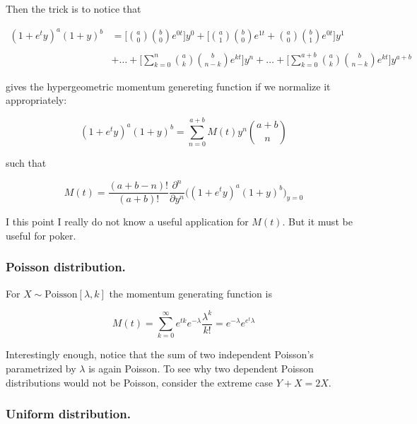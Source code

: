\documentclass[12pt]{article}
\begin{document}
\noindent
Then the trick is to notice that

\begin{align}
( 1 + e^{t} y )^{a} ( 1 + y )^{b} &= 
\bigg[ {a \choose 0} {b \choose 0}  e^{0 t} \bigg] y^{0} +
\bigg[ {a \choose 1} {b \choose 0}  e^{1 t} + {a \choose 0} {b \choose 1}  e^{0 t}  \bigg] y^{1} 
\nonumber \\
\nonumber \\
&+  \ldots + \bigg[ \sum_{k = 0}^{n} {a \choose k} {b \choose n - k}  e^{k t} \bigg] y^{n}  + \ldots 
+ \bigg[ \sum_{k = 0}^{a + b} {a \choose k} {b \choose n - k}  e^{k t} \bigg] y^{a+b} 
\end{align}

\noindent
gives the hypergeometric momentum genereting function if we normalize it appropriately:

\begin{equation}
( 1 + e^{t} y )^{a} ( 1 + y )^{b} = 
\sum_{n = 0}^{a + b} M(t) y^{n} { a + b \choose n }
\end{equation}

\noindent
such that

\begin{equation}
M(t) = 
\frac{(a + b - n)!}{(a + b)!}
\frac{\partial^{n}}{\partial y^{n} } 
\bigg( ( 1 + e^{t} y )^{a} ( 1 + y )^{b} \bigg)_{y = 0}
\end{equation}

\noindent
I this point I really do not know a useful application for $M(t)$. 
But it must be useful for poker.

\subsubsection{Poisson distribution.}

For $X \sim \text{Poisson}[\lambda, k]$ the momentum generating function is

\begin{equation}
M(t) = \sum_{k = 0}^{\infty} e^{tk} e^{-\lambda} \frac{\lambda^{k}}{k!}  = e^{-\lambda} e^{e^{t} \lambda}
\end{equation}

\noindent
Interestingly enough, notice that the sum of two independent Poisson's parametrized by $\lambda$ is
again Poisson.
To see why two dependent Poisson distributions would not be Poisson, consider the extreme case $Y + X = 2X$.

\subsubsection{Uniform distribution.}
\end{document}
